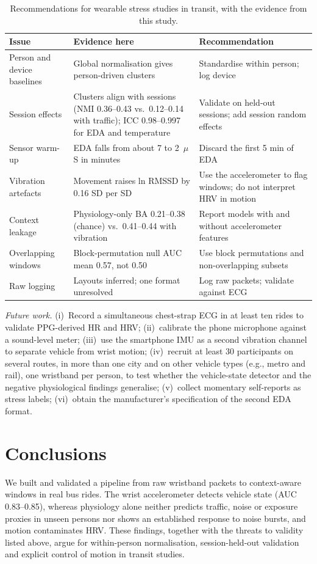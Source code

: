 \documentclass[runningheads]{llncs}
\begin{document}
\begin{table}[t]
\caption{Recommendations for wearable stress studies in transit, with the evidence from this study.}
\label{tab:recs}
\centering
\footnotesize
\setlength{\tabcolsep}{3pt}
\begin{tabular}{>{\raggedright\arraybackslash}p{2.3cm}>{\raggedright\arraybackslash}p{4.9cm}>{\raggedright\arraybackslash}p{4.4cm}}
\toprule
Issue & Evidence here & Recommendation\\
\midrule
Person and device baselines & Global normalisation gives person-driven clusters & Standardise within person; log device\\
Session effects & Clusters align with sessions (NMI 0.36--0.43 vs.\ 0.12--0.14 with traffic); ICC 0.98--0.997 for EDA and temperature & Validate on held-out sessions; add session random effects\\
Sensor warm-up & EDA falls from about 7 to 2~$\mu$S in minutes & Discard the first 5 min of EDA\\
Vibration artefacts & Movement raises ln RMSSD by 0.16 SD per SD & Use the accelerometer to flag windows; do not interpret HRV in motion\\
Context leakage & Physiology-only BA 0.21--0.38 (chance) vs.\ 0.41--0.44 with vibration & Report models with and without accelerometer features\\
Overlapping windows & Block-permutation null AUC mean 0.57, not 0.50 & Use block permutations and non-overlapping subsets\\
Raw logging & Layouts inferred; one format unresolved & Log raw packets; validate against ECG\\
\bottomrule
\end{tabular}
\end{table}

\emph{Future work.} (i)~Record a simultaneous chest-strap ECG in at least ten rides to validate PPG-derived HR and HRV; (ii)~calibrate the phone microphone against a sound-level meter; (iii)~use the smartphone IMU as a second vibration channel to separate vehicle from wrist motion; (iv)~recruit at least 30 participants on several routes, in more than one city and on other vehicle types (e.g., metro and rail), one wristband per person, to test whether the vehicle-state detector and the negative physiological findings generalise; (v)~collect momentary self-reports as stress labels; (vi)~obtain the manufacturer's specification of the second EDA format.

\section{Conclusions}
We built and validated a pipeline from raw wristband packets to context-aware windows in real bus rides. The wrist accelerometer detects vehicle state (AUC 0.83--0.85), whereas physiology alone neither predicts traffic, noise or exposure proxies in unseen persons nor shows an established response to noise bursts, and motion contaminates HRV. These findings, together with the threats to validity listed above, argue for within-person normalisation, session-held-out validation and explicit control of motion in transit studies.
\end{document}

